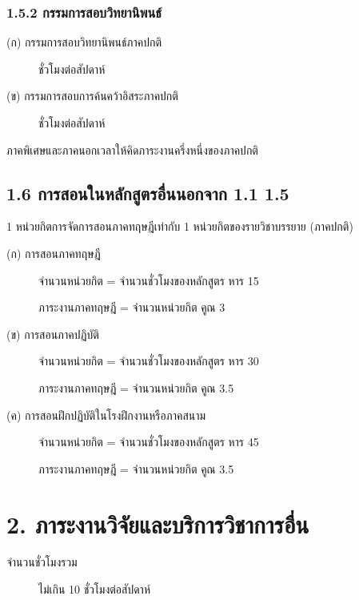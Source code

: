 \documentclass[a4paper,12pt,english]{sphinxmanual}
\begin{document}
\subsection{1.5.2 กรรมการสอบวิทยานิพนธ์}
\label{\detokenize{1teaching:id19}}\begin{description}
\item[{(ก) กรรมการสอบวิทยานิพนธ์ภาคปกติ}]  ชั่วโมงต่อสัปดาห์

\item[{(ข) กรรมการสอบการค้นคว้าอิสระภาคปกติ}]  ชั่วโมงต่อสัปดาห์

\end{description}

ภาคพิเศษและภาคนอกเวลาให้คิดภาระงานครึ่งหนึ่งของภาคปกติ


\section{1.6 การสอนในหลักสูตรอื่นนอกจาก 1.1 \sphinxhyphen{} 1.5}
\label{\detokenize{1teaching:id20}}
1 หน่วยกิตการจัดการสอนภาคทฤษฎีเท่ากับ 1 หน่วยกิตของรายวิชาบรรยาย (ภาคปกติ)
\begin{description}
\item[{(ก) การสอนภาคทฤษฎี}] \leavevmode
จำนวนหน่วยกิต = จำนวนชั่วโมงของหลักสูตร หาร 15

ภาระงานภาคทฤษฎี = จำนวนหน่วยกิต คูณ 3

\item[{(ข) การสอนภาคปฏิบัติ}] \leavevmode
จำนวนหน่วยกิต = จำนวนชั่วโมงของหลักสูตร หาร 30

ภาระงานภาคทฤษฎี = จำนวนหน่วยกิต คูณ 3.5

\item[{(ค) การสอนฝึกปฏิบัติในโรงฝึกงานหรือภาคสนาม}] \leavevmode
จำนวนหน่วยกิต = จำนวนชั่วโมงของหลักสูตร หาร 45

ภาระงานภาคทฤษฎี = จำนวนหน่วยกิต คูณ 3.5

\end{description}


\chapter{2. ภาระงานวิจัยและบริการวิชาการอื่น}
\label{\detokenize{2research:id1}}\label{\detokenize{2research::doc}}\begin{description}
\item[{จำนวนชั่วโมงรวม}] \leavevmode
ไม่เกิน 10 ชั่วโมงต่อสัปดาห์

\end{description}
\end{document}
